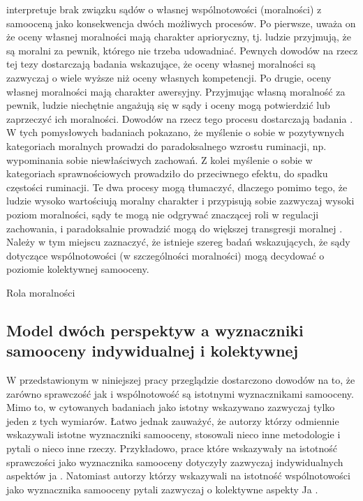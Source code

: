 \documentclass[man]{apa6}
\begin{document}
\textcite{wojciszke2010sprawczosc} interpretuje brak związku sądów o własnej wspólnotowości (moralności) z samooceną jako konsekwencja dwóch możliwych procesów. Po pierwsze, uważa on że oceny własnej moralności mają charakter aprioryczny, tj. ludzie przyjmują, że są moralni za pewnik, którego nie trzeba udowadniać. Pewnych dowodów na rzecz tej tezy dostarczają badania \textcite{wojciszke2010sprawczosc} wskazujące, że oceny własnej moralności są zazwyczaj o wiele wyższe niż oceny własnych kompetencji. Po drugie, oceny własnej moralności mają charakter awersyjny. Przyjmując własną moralność za pewnik, ludzie niechętnie angażują się w sądy i oceny mogą potwierdzić lub zaprzeczyć ich moralności. Dowodów na rzecz tego procesu dostarczają badania \textcite{baryla2005wplyw}. W tych pomysłowych badaniach pokazano, że myślenie o sobie w pozytywnych kategoriach moralnych prowadzi do paradoksalnego wzrostu ruminacji, np. wypominania sobie niewłaściwych zachowań. Z kolei myślenie o sobie w kategoriach sprawnościowych prowadziło do przeciwnego efektu, do spadku częstości ruminacji. Te dwa procesy mogą tłumaczyć, dlaczego pomimo tego, że ludzie wysoko wartościują moralny charakter \parencite{gausel2011concern, goodwin2014moral} i przypisują sobie zazwyczaj wysoki poziom moralności, sądy te mogą nie odgrywać znaczącej roli w regulacji zachowania, i paradoksalnie prowadzić mogą do większej transgresji moralnej \parencite{merritt2010moral, monin2001moral, iyer2012sugaring}.\\

Należy w tym miejscu zaznaczyć, że istnieje szereg badań wskazujących, że sądy dotyczące wspólnotowości (w szczególności moralności) mogą decydować o poziomie kolektywnej samooceny.

Rola moralności \parencite{ellemers2008better, ellemers2012morality, leach2007group, pagliaro2011sharing}

\newpage
\subsection{Model dwóch perspektyw a wyznaczniki samooceny indywidualnej i kolektywnej}

W przedstawionym w niniejszej pracy przeglądzie dostarczono dowodów na to, że zarówno sprawczość jak i wspólnotowość są istotnymi wyznacznikami samooceny. Mimo to, w cytowanych badaniach jako istotny wskazywano zazwyczaj tylko jeden z tych wymiarów. Łatwo jednak zauważyć, że autorzy którzy odmiennie wskazywali istotne wyznaczniki samooceny, stosowali nieco inne metodologie i pytali o nieco inne rzeczy. Przykładowo, prace które wskazywały na istotność sprawczości jako wyznacznika samooceny dotyczyły zazwyczaj indywidualnych aspektów ja \parencite[np., ][]{wojciszke2011self}. Natomiast autorzy którzy wskazywali na istotność wspólnotowości jako wyznacznika samooceny pytali zazwyczaj o kolektywne aspekty Ja \parencite[np., ][]{leach2007group, ellemers2008better}. \\
\end{document}

